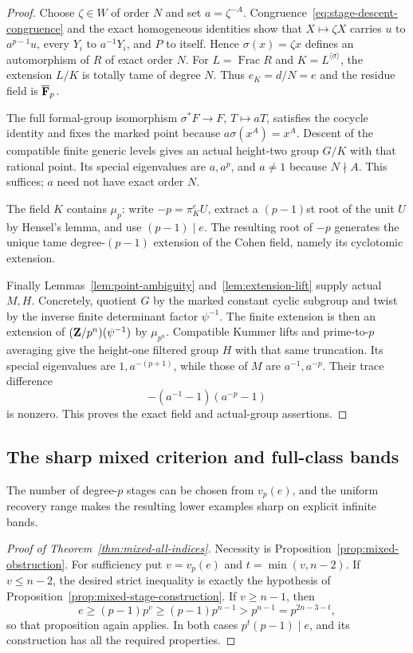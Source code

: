 \begin{proof}
Choose $\zeta\in W$ of order $N$ and set $a=\zeta^{-A}$. Congruence~\eqref{eq:stage-descent-congruence} and the exact homogeneous identities show that $X\mapsto\zeta X$ carries $u$ to $a^{p-1}u$, every $Y_i$ to $a^{-1}Y_i$, and $P$ to itself. Hence $\sigma(x)=\zeta x$ defines an automorphism of $R$ of exact order $N$. For $L=\operatorname{Frac}R$ and $K=L^{\langle\sigma\rangle}$, the extension $L/K$ is totally tame of degree $N$. Thus $e_K=d/N=e$ and the residue field is $\overline{\mathbf F}_p$.

The full formal-group isomorphism $\sigma^*F\to F$, $T\mapsto aT$, satisfies the cocycle identity and fixes the marked point because $a\sigma(x^A)=x^A$. Descent of the compatible finite generic levels gives an actual height-two group $G/K$ with that rational point. Its special eigenvalues are $a,a^p$, and $a\ne1$ because $N\nmid A$. This suffices; $a$ need not have exact order $N$.

The field $K$ contains $\mu_p$: write $-p=\pi_K^eU$, extract a $(p-1)$st root of the unit $U$ by Hensel's lemma, and use $(p-1)\mid e$. The resulting root of $-p$ generates the unique tame degree-$(p-1)$ extension of the Cohen field, namely its cyclotomic extension.

Finally Lemmas~\ref{lem:point-ambiguity} and~\ref{lem:extension-lift} supply actual $M,H$. Concretely, quotient $G$ by the marked constant cyclic subgroup and twist by the inverse finite determinant factor $\psi^{-1}$. The finite extension is then an extension of $(\mathbf Z/p^n)(\psi^{-1})$ by $\mu_{p^n}$. Compatible Kummer lifts and prime-to-$p$ averaging give the height-one filtered group $H$ with that same truncation. Its special eigenvalues are $1,a^{-(p+1)}$, while those of $M$ are $a^{-1},a^{-p}$. Their trace difference
\[
                         -(a^{-1}-1)(a^{-p}-1)
\]
is nonzero. This proves the exact field and actual-group assertions.
\end{proof}

\subsection{The sharp mixed criterion and full-class bands}
The number of degree-$p$ stages can be chosen from $v_p(e)$, and the uniform recovery range makes the resulting lower examples sharp on explicit infinite bands.

\begin{proof}[Proof of Theorem~\ref{thm:mixed-all-indices}]
Necessity is Proposition~\ref{prop:mixed-obstruction}. For sufficiency put $v=v_p(e)$ and $t=\min(v,n-2)$. If $v\le n-2$, the desired strict inequality is exactly the hypothesis of Proposition~\ref{prop:mixed-stage-construction}. If $v\ge n-1$, then
\[
                 e\ge(p-1)p^v\ge(p-1)p^{n-1}>p^{n-1}
                    =p^{2n-3-t},
\]
so that proposition again applies. In both cases $p^t(p-1)\mid e$, and its construction has all the required properties.
\end{proof}

